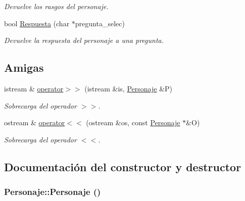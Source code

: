 \begin{CompactItemize}
\begin{CompactList}\small\item\em Devuelve los rasgos del personaje. \item\end{CompactList}\item 
bool \hyperlink{class_personaje_835c36dac86ff1b595dbdb3c5914b79c}{Respuesta} (char $\ast$pregunta\_\-selec)
\begin{CompactList}\small\item\em Devuelve la respuesta del personaje a una pregunta. \item\end{CompactList}\end{CompactItemize}
\subsection*{Amigas}
\begin{CompactItemize}
\item 
istream \& \hyperlink{class_personaje_7cd04bde49bfa0ddbc0034d9358e34b0}{operator$>$$>$} (istream \&is, \hyperlink{class_personaje}{Personaje} \&P)
\begin{CompactList}\small\item\em Sobrecarga del operador $>$$>$. \item\end{CompactList}\item 
ostream \& \hyperlink{class_personaje_5b0e555e2e3415573e9ab2d692150594}{operator$<$$<$} (ostream \&os, const \hyperlink{class_personaje}{Personaje} $\ast$\&O)
\begin{CompactList}\small\item\em Sobrecarga del operador $<$$<$. \item\end{CompactList}\end{CompactItemize}


\subsection{Documentación del constructor y destructor}
\hypertarget{class_personaje_9238a75aae652b20dd423e85cfa1ee17}{
\subsubsection[{Personaje}]{\setlength{\rightskip}{0pt plus 5cm}Personaje::Personaje ()}}
\label{class_personaje_9238a75aae652b20dd423e85cfa1ee17}


